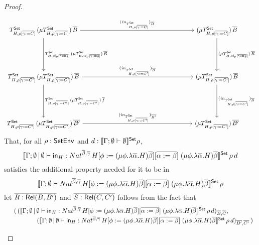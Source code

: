 \documentclass[acmsmall,review,anonymous]{acmart}
\theoremstyle{definition}
\newcommand{\set}{\mathsf{Set}}
\renewcommand{\id}{\mathit{id}}
\begin{document}
\begin{proof}
\begin{itemize}
{\[\begin{tikzcd}[column sep=2.5in, row sep=0.75in]
T^\set_{H,\rho[\ol{\gamma := C}]}\, (\mu T^\set_{H,\rho[\ol{\gamma := C}]})\, \ol{B}
\ar[d, "{T^\set_{H,\id_\rho[\ol{\gamma := g}]}\,(\mu
    T^\set_{H,\id_\rho[\ol{\gamma := g}]}) \, \ol{B}}"] \ar[r,
  "{(\mathit{in}_{T^\set_{H,\rho[\ol{\gamma := C}]}})_{\ol{B}}}" ]
& (\mu T^\set_{H,\rho[\ol{\gamma := C}]})\, \ol{B} \ar[d, "{(\mu
    T^\set_{H,\id_\rho[\ol{\gamma := g}]}) \, \ol{B}}"]\\
T^\set_{H,\rho[\ol{\gamma := C'}]}\, (\mu
T^\set_{H,\rho[\ol{\gamma := C'}]})\, \ol{B} \ar[d, "{T^\set_{H,\rho[\ol{\gamma :=
          C'}]}\, (\mu T^\set_{H,\rho[\ol{\gamma := C'}]})\, \ol{f}}"]
\ar[r,"{(\mathit{in}_{T^\set_{H,\rho[\ol{\gamma := C'}]}})_{\ol{B}}}" ] & 
  (\mu T^\set_{H,\rho[\ol{\gamma := C'}]})\, \ol{B}
\ar[d,"{(\mathit{in}_{T^\set_{H,\rho[\ol{\gamma := C'}]}})_{\ol{B}}}" ] 
\\
T^\set_{H,\rho[\ol{\gamma := C'}]}\, (\mu T^\set_{H,\rho[\ol{\gamma := C'}]})\,
\ol{B'} \ar[r, "{(\mathit{in}_{T^\set_{H,\rho[\ol{\gamma :=
            C'}]}})_{\ol{B'}}}"] & (\mu T^\set_{H,\rho[\ol{\gamma := C'}]})\,
\ol{B'}
\end{tikzcd}\]
}
  That, for all $\rho : \mathsf{SetEnv}$ and $d :
\setsem{\Gamma;\emptyset \vdash \emptyset}\rho$,
\[\setsem{\Gamma;\emptyset \,|\, \emptyset \vdash
  \tin_H : Nat^{\ol{\beta},\ol{\gamma}} \, H[\phi := (\mu \phi.\lambda
    {\overline \alpha}.H){\overline \beta}][\ol{\alpha := \beta}]
  \;(\mu \phi.\lambda {\overline \alpha}.H){\overline
    \beta}}\,\rho\,d\] satisfies the additional property needed for
it to be in \[\setsem{\Gamma;\emptyset \vdash
  Nat^{\ol{\beta},\ol{\gamma}} \, H[\phi := (\mu \phi.\lambda
    {\overline \alpha}.H){\overline \beta}][\ol{\alpha := \beta}]
  \;(\mu \phi.\lambda {\overline \alpha}.H){\overline \beta}}\,\rho\]
  let $\overline{R : \mathsf{Rel}(B,B')}$ and $\overline{S : \mathsf{Rel}(C,C')}$ follows from the
  fact that 
\[\begin{array}{ll}
 & (\,(\setsem{\Gamma;\emptyset \,|\, \emptyset \vdash
  \tin_H : Nat^{\ol{\beta},\ol{\gamma}} \, H[\phi := (\mu \phi.\lambda
    {\overline \alpha}.H){\overline \beta}][\ol{\alpha := \beta}]
  \;(\mu \phi.\lambda {\overline \alpha}.H){\overline
    \beta}}\,\rho\,d)_{\ol{B},\ol{C}},\,\\
 & \hspace*{0.5in}(\setsem{\Gamma;\emptyset \,|\, \emptyset \vdash
  \tin_H : Nat^{\ol{\beta},\ol{\gamma}} \, H[\phi := (\mu \phi.\lambda
    {\overline \alpha}.H){\overline \beta}][\ol{\alpha := \beta}]
  \;(\mu \phi.\lambda {\overline \alpha}.H){\overline
    \beta}}\,\rho\,d)_{\ol{B'},\ol{C'}}\,)\\

\end{array}\]
\end{itemize}
\end{proof}
\end{document}
